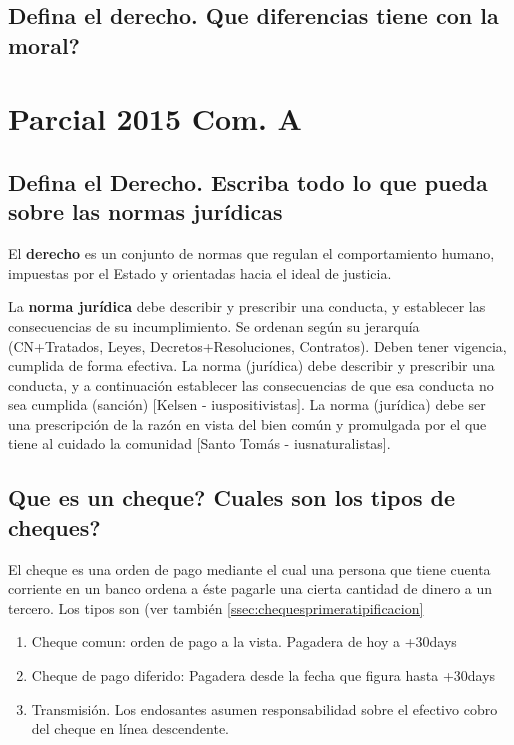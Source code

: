 \documentclass{article}
\begin{document}
\subsection{Defina el derecho. Que diferencias tiene con la moral?}

\section{Parcial 2015 Com. A}
\subsection{Defina el Derecho. Escriba todo lo que pueda sobre las normas jurídicas}
\label{sec:DefDerechoYNormaJuridica}
El \textbf{derecho} es un conjunto de normas que regulan el comportamiento humano, impuestas por el Estado y orientadas hacia el ideal de justicia. 

La \textbf{norma jurídica} debe describir y prescribir una conducta, y establecer las consecuencias de su incumplimiento. Se ordenan según su jerarquía (CN+Tratados, Leyes, Decretos+Resoluciones, Contratos). Deben tener vigencia, cumplida de forma efectiva.
La norma (jurídica) debe describir y prescribir una conducta, y a continuación establecer las consecuencias de que esa conducta no sea cumplida (sanción) [Kelsen - iuspositivistas]. 
La norma (jurídica) debe ser una prescripción de la razón en vista del bien común y promulgada por el que tiene al cuidado la comunidad [Santo Tomás - iusnaturalistas]. 

\subsection{Que es un cheque? Cuales son los tipos de cheques?}
El cheque es una orden de pago mediante el cual una persona que tiene cuenta corriente en un banco ordena a éste pagarle una cierta cantidad de dinero a un tercero. Los tipos son (ver también \ref{ssec:chequesprimeratipificacion} 
\begin{enumerate}
\item Cheque comun: orden de pago a la vista. Pagadera de hoy a +30days
\item Cheque de pago diferido: Pagadera desde la fecha que figura hasta +30days
\item Transmisión. Los endosantes asumen responsabilidad sobre el efectivo cobro del cheque en línea descendente. 
\end{enumerate}
\end{document}
